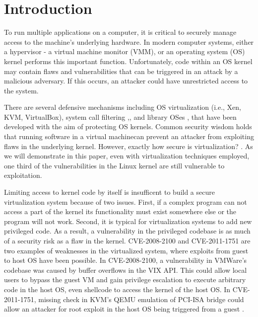 \section{Introduction}
\label{sec.introduction}

To run multiple applications on a computer, it is critical to securely
manage access to the machine's underlying hardware. In modern computer systems, either a hypervisor - a virtual machine monitor (VMM), or an
operating system (OS) kernel performs this important function. Unfortunately, code within an OS kernel may contain flaws and vulnerabilities that can be triggered in an attack by a malicious adversary. If this occurs, an attacker
could have unrestricted access to the system.


There are several defensive %
mechanisms including OS virtualization (i.e., Xen,
 KVM, VirtualBox), system call filtering \cite{Janus:99},\cite{SCI-04},
and library OSes \cite{Bascule},\cite{Drawbridge-11} that have been developed with the aim of 
protecting OS kernels. Common security wisdom holds that running software in a
virtual machinecan prevent an attacker from exploiting flaws in the underlying
kernel. However, exactly how secure is virtualization? \cite{Tal}. As we will
demonstrate in this paper, even with virtualization techniques employed, one
third of the vulnerabilities in the Linux kernel are still vulnerable to exploitation.

Limiting access to kernel code by itself is insufficent to build a secure virtualization system because of two issues. First, if a complex program can not access a part of the kernel its functionality  must exist somewhere else or the program will not work. Second, it is typical for virtualization systems to add new privileged code. As a result, a vulnerability in the privileged codebase is as much of a security risk as a flaw in the kernel. CVE-2008-2100 and CVE-2011-1751 are two examples of weaknesses in the virtualized system, where exploits from guest to host OS have been possible. In CVE-2008-2100, a vulnerability in VMWare's codebase was caused by buffer overflows in the VIX API. This could allow local users to bypass the guest VM and gain privilege escalation to execute arbitrary code in the host OS, even shellcode to access the kernel of the host OS. In CVE-2011-1751, missing check in KVM's QEMU emulation of PCI-ISA bridge could allow an attacker for root exploit in the host OS being triggered from a guest \cite{Virtunoid}. 

